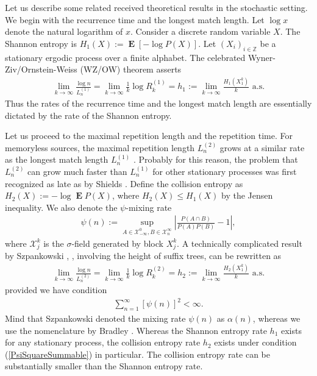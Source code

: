 \documentclass[a4paper,12pt]{article}
\newcommand{\abs}[1]{\left| #1 \right|}
\newcommand{\kwad}[1]{\left[ #1 \right]}
\DeclareMathOperator{\mean}{\mathbf{E}}
\begin{document}
Let us describe some related received theoretical results in the
stochastic setting. We begin with the recurrence time and the longest
match length.  Let $\log x$ denote the natural logarithm of $x$.
Consider a discrete random variable $X$. The Shannon entropy is
$H_1(X):=\mean\kwad{-\log P(X)}$. Let $(X_i)_{i\in\mathbb{Z}}$ be a
stationary ergodic process over a finite alphabet. The celebrated
Wyner-Ziv/Ornstein-Weiss (WZ/OW) theorem
\cite{WynerZiv89,OrnsteinWeiss93} asserts
\begin{align}
  \label{WZOW}
  \lim_{k\to\infty} \frac{\log n}{L^{(1)}_n}
  =\lim_{k\to\infty} \frac{1}{k}\log R^{(1)}_k
  =h_1:=\lim_{k\to\infty} \frac{H_1(X_1^k)}{k}
  \text{ a.s.}
\end{align}
Thus the rates of the recurrence time and the longest match length are
essentially dictated by the rate of the Shannon entropy.

Let us proceed to the maximal repetition length and the repetition
time.  For memoryless sources, the maximal repetition length
$L^{(2)}_n$ grows at a similar rate as the longest match length
$L^{(1)}_n$ \cite{ErdosRenyi70,ArratiaWaterman89}. Probably for this
reason, the problem that $L^{(2)}_n$ can grow much faster than
$L^{(1)}_n$ for other stationary processes was first recognized as
late as by Shields \cite{Shields92b,Shields97}. Define the collision
entropy as $H_2(X):=-\log\mean P(X)$, where $H_2(X)\le H_1(X)$ by the
Jensen inequality. We also denote the $\psi$-mixing rate
\begin{align}
  \psi(n):=
  \sup_{A\in\mathcal{X}_{-\infty}^0,B\in\mathcal{X}_n^{\infty}}
  \abs{\frac{P(A\cap B)}{P(A)P(B)}-1},
\end{align}
where $\mathcal{X}_j^k$ is the $\sigma$-field generated by block
$X_j^k$.  A technically complicated result by Szpankowski
\cite[Theorem 2(ii)]{Szpankowski93}, \cite{Szpankowski93a}, involving
the height of suffix trees, can be rewritten as
\begin{align}
  \label{Szpankowski}
  \lim_{k\to\infty} \frac{\log n}{L^{(2)}_n}
  =\lim_{k\to\infty} \frac{1}{k}\log R^{(2)}_k
  =h_2:=\lim_{k\to\infty} \frac{H_2(X_1^k)}{k}
  \text{ a.s.}
\end{align}
provided we have condition
\begin{align}
  \label{PsiSquareSummable}
  \sum_{n=1}^\infty \kwad{\psi(n)}^2<\infty.
\end{align}
Mind that Szpankowski \cite{Szpankowski93} denoted the mixing rate
$\psi(n)$ as $\alpha(n)$, whereas we use the nomenclature by Bradley
\cite{Bradley05}.  Whereas the Shannon entropy rate $h_1$ exists for
any stationary process, the collision entropy rate $h_2$ exists under
condition (\ref{PsiSquareSummable}) in particular. The collision
entropy rate can be substantially smaller than the Shannon entropy
rate.
\end{document}
